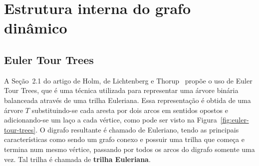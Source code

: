 \section{Estrutura interna do grafo dinâmico}
\label{sec:dynamic-graph-implementation}

\subsection{Euler Tour Trees}
\label{sec:euler-tour-trees}

A Seção~2.1 do artigo de Holm, de Lichtenberg e Thorup~\cite{jacob_holm} propõe o uso de Euler Tour Trees, que é uma técnica utilizada para representar uma árvore binária balanceada através de uma trilha Euleriana. Essa representação é obtida de uma árvore $T$ substituindo-se cada aresta por dois arcos em sentidos opostos e adicionando-se um laço a cada vértice, como pode ser visto na Figura~\ref{fig:euler-tour-trees}. O digrafo resultante é chamado de Euleriano, tendo as principais características como sendo um grafo conexo e possuir uma trilha que começa e termina num mesmo vértice, passando por todos os arcos do digrafo somente uma vez. Tal trilha é chamada de \textbf{trilha Euleriana}.

